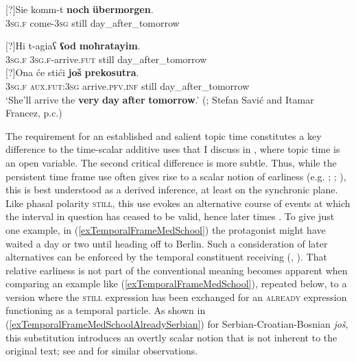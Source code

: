 \begin{exe}
	\ex\label{exTemporalUebermorgen}
	\begin{xlist}
		\exi{}[?]{\gll Sie komm-t \textbf{noch} \textbf{übermorgen}.\\
		3\textsc{sg}.\textsc{f} come-3\textsc{sg} still day\_after\_tomorrow\\}

		\exi{}[?]{\gll Hi t-agiaʕ \textbf{ʕod} \textbf{moħratayim}.\\
		3\textsc{sg}.\textsc{f} 3\textsc{sg}.\textsc{f}-arrive.\textsc{fut} still day\_after\_tomorrow\\}
		\exi{}[?]{\gll Ona će stići \textbf{još} \textbf{prekosutra}.\\
	3\textsc{sg}.\textsc{f} \textsc{aux}.\textsc{fut}:3\textsc{sg} arrive.\textsc{pfv}.\textsc{inf} still day\_after\_tomorrow\\
		\glt \lq She'll arrive the \textbf{very} \textbf{day} \textbf{after} \textbf{tomorrow}.\rq{ }(\cite[202]{Loebner1989}; Stefan Savić and Itamar Francez, p.c.)}
	\end{xlist}
\end{exe}

The requirement for an established and salient topic time constitutes a key difference to the time-scalar additive uses that I discuss in , where topic time is an open variable. The second critical difference is more subtle. Thus, while the persistent time frame use often gives rise to a scalar notion of earliness (e.g. \cite[s.v. \textit{noch}]{Duden}; \cite[185]{Helbig1994}; \cite{Loebner1989}), this is best understood as a derived inference, at least on the synchronic plane. Like phasal polarity \textsc{still}, this use evokes an alternative course of events at which the interval in question has ceased to be valid, hence later times \parencite[200]{Vandeweghe1992}. To give just one example, in (\ref{exTemporalFrameMedSchool}) the protagonist might have waited a day or two until heading off to Berlin. Such a consideration of later alternatives can be enforced by the temporal constituent receiving  (\cite{Beck2016}, \citeyear{Beck2020}). That relative earliness is not part of the conventional meaning becomes apparent when comparing an example like (\ref{exTemporalFrameMedSchool}), repeated below, to a version where the \textsc{still} expression has been exchanged for an \textsc{already} expression functioning as a temporal  particle. As shown in (\ref{exTemporalFrameMedSchoolAlreadySerbian}) for Serbian\hyp Croatian\hyp Bosnian \textit{još}, this substitution introduces an overtly scalar notion that is not inherent to the original text; see \textcite{Mustajoki1988} and \textcite{Rombouts1979} for similar observations.

